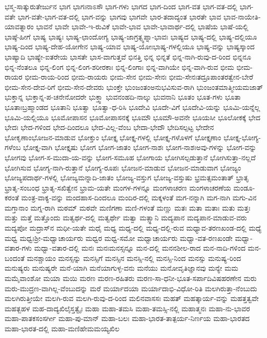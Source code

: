 {ಭಸ್ಮ-ಸಾತ್ಕುರುತೇರ್ಜುನ
ಭಾಗ
ಭಾಗಃನಾಽಸೌ
ಭಾಗ-ಗಳು
ಭಾಗದ
ಭಾಗ-ದಿಂದ
ಭಾಗ-ವತ
ಭಾಗ-ವತ-ದಲ್ಲಿ
ಭಾಗ-ವತೇ
ಭಾಗ-ವತೇ-ಭಾಗ-ವತ-ದಲ್ಲಿ
ಭಾಗ-ವನ್ನು
ಭಾಗವು
ಭಾಗವೇ
ಭಾರ-ತದಾದ್ಯಂತ
ಭಾರತೇ
ಭಾವ
ಭಾವ-ನಾಯೇತಿ-ಯಾವತ್ನಾರಂ
ಭಾವನೆ
ಭಾವೇ
ಭಾವೇ-ಇ-ರುವಿಕೆ
ಭಾವೇ-ಭಾವ
ಭಾವೇ-ಭಾವಾರ್ಥ-ದಲ್ಲಿ
ಭಾಷೆಯ
ಭಾಷೆ-ಯಲ್ಲಿ
ಭಾಷ್ಠೆ-ಹೀಗೆ
ಭಾಷ್ಯ
ಭಾಷ್ಯಃ
ಭಾಷ್ಯ-ಛಾಂದೋಗ್ಯ
ಭಾಷ್ಯ-ಜಾಗ್ರತ್ಸ್ವಪ್ನಾ-ಭಾವಃ
ಭಾಷ್ಯದ
ಭಾಷ್ಯ-ದಲ್ಲಿ
ಭಾಷ್ಯ-ದಲ್ಲಿಯೂ
ಭಾಷ್ಯ-ದಿಂದ
ಭಾಷ್ಯ-ದೇಹ-ಯೋಗೇನ
ಭಾಷ್ಯ-ಯಾವ
ಭಾಷ್ಯ-ಯೋಃಭಾಷ್ಯ-ಗಳಲ್ಲಿಯೂ
ಭಾಷ್ಯ-ವನ್ನು
ಭಾಷ್ಯಸ್ಕಾಂದ
ಭಾಷ್ಯಾದಿ
ಭಾಷ್ಯೇ-ಐತರೇಯ
ಭಾಸತೇ
ಭಾಸ-ವಾಗುತ್ತವೆ
ಭಿನತ್ತಿ
ಭಿನ್ನ
ಭಿನ್ನತೆ
ಭಿನ್ನ-ನಾಗಿ-ರುವು-ದ-ರಿಂದ
ಭಿನ್ನನೂ
ಭಿನ್ನ-ನೆಂತಲೂ
ಭಿನ್ನ-ಲಿಂಗ
ಭಿನ್ನ-ಲಿಂಗ-ಶರೀರಕಾಃ
ಭಿನ್ನ-ಲಿಂಗಾಃ
ಭಿನ್ನ-ವಾಗಿಯೇ
ಭಿನ್ನ-ವಾಗಿ-ರುವ
ಭೀಮ
ಭೀಮ-ರಾಯರ
ಭೀಮ-ರಾಯ-ರಿಂದ
ಭೀಮ-ರಾಯರು
ಭೀಮ-ಸೇನ
ಭೀಮ-ಸೇನಃ
ಭೀಮ-ಸೇನಃತದ್ರೂಪಾಂತರತ್ವೇನ-ಬೇರೆ
ಭೀಮ-ಸೇನ-ದೇವ-ರಿಗೆ
ಭೀಮ-ಸೇನ-ದೇವರು
ಭುಂಕ್ತೇ
ಭುಂಜಂತಂಅನುಭವಿಸುವ-ರಾಗಿ
ಭುಂಜಂತಮಾತ್ಮೀಯಮಜಾತ್
ಭುಕ್ತಾನ್ನ
ಭುಕ್ತಾನ್ನ-ಪ-ಚನೇನೋದರೇ
ಭುಕ್ತ್ವಾ
ಭುವನಂಹದಿ-ನಾಲ್ಕು
ಭುವನಾನಿ
ಭೂತಂ
ಭೂತ-ಗಳು
ಭೂತಾ
ಭೂತಾಃಬ್ರಹ್ಮಾಂಡದ
ಭೂತಾನಿ
ಭೂತ್ವಾ
ಭೂತ್ವಾ-ಧ-ರಿಸಿ
ಭೂದೇವಿ
ಭೂದೇ-ವಿಗೆ
ಭೂದೇವಿ-ಯನ್ನು
ಭೂಮಿ-ಯನ್ನೆಲ್ಲ
ಭೂಮಿ-ಯಲ್ಲಿಯೂ
ಭೂಮೋಪಾಸನ
ಭೂಮೋಪಾಸನಕ್ಕೆ
ಭೂಮೌ
ಭೂಮೌ-ಅವನೇ
ಭೂಯಸೀ
ಭೂಲೋಕಕ್ಕೆ
ಭೇದ
ಭೇದಃ
ಭೇದ-ಗಳಿಂದ
ಭೇದ-ದಿಂದಲೂ
ಭೇದ-ವಿಲ್ಲ-ವೆಂಬ
ಭೇದಾ-ಭೇದೌ
ಭೇದಿಸಲ್ಪಟ್ಟ
ಭೇದೇನ
ಭೋಕೃಣಾಂಭೋಜನ-ಮಾಡುವ
ಭೋಕ್ತುಂ
ಭೋಕ್ತೃ
ಭೋಕ್ತೃ-ಗಳಲ್ಲಿ
ಭೋಕ್ತೃ-ಗಳೊಳಗೆ
ಭೋಕ್ತೃಣಾಂ
ಭೋಕ್ತೃ-ಭೋಗ್ಯ-ಗಳೆಂಬ
ಭೋಕ್ತೃ-ವಾಗಿ
ಭೋಕ್ತೃಷು
ಭೋಗ
ಭೋಗ-ಜಾತಂ
ಭೋಗ-ನಾಶಃ
ಭೋಗ-ನಾಶಃಅವು-ಗಳನ್ನು
ಭೋಗ-ವನ್ನು
ಭೋಗವು
ಭೋಗ-ಸ-ಮುದಾ-ಯ-ವನ್ನು
ಭೋಗ-ಸಮೂಹ
ಭೋಗಾಯ
ಭೋಗಿಸಲ್ಪಡುತ್ತಾನೆ
ಭೋಗಿಸುತ್ತಾ-ನಲ್ಲದೆ
ಭೋಗಿಸುವ
ಭೋಗ್ಯ-ನಾಗಿ-ರುತ್ತಾನೆ
ಭೋಗ್ಯ-ರೂಪಃ
ಭೋಜನ-ಮಾಡುವ
ಭೋಜನ-ಮಾಡುವಾಗ
ಭೋಜ್ಯಂ
ಭೋಜ್ಯಪದಾರ್ಥ-ಗಳಲ್ಲಿ
ಭೋಜ್ಯಮನ್ನಾದಿ-ಜಾತಂ
ಭೋಜ್ಯ-ವಸ್ತುಗ
ಭೋಜ್ಯ-ವಸ್ತುಷು
ಭ್ರಮತ್ಸಮಂತಾತ್
ಭ್ರಾತೃ
ಭ್ರಾತೃ-ಸಂಬಂಧ
ಭ್ರಾತೃ-ಸಖಿತ್ವೇನ
ಭ್ರಾಮ-ಯತೇ
ಮಂಗಳ-ಗಳನ್ನೂ
ಮಂಗಳಾಚರಣ
ಮಂಗಳಾಚರಣೆಯ
ಮಂಡೂ-ಕರಂತೆ
ಮಂತ್ರ-ವಾಕ್ಯ-ವನ್ನು
ಮಂದಹಾಸ-ದಿಂದಲೂ
ಮಂದಿರ-ದಲ್ಲಿ
ಮಕ್ಕಳಂತೆ
ಮಗ-ನನ್ನಾಗಿ
ಮಗ-ನಾಗಿ
ಮಗು-ವಿನ
ಮಗ್ತಾನಾಂ
ಮಗ್ನ-ರಾಗಿ
ಮಠಮ್
ಮಠವೇ
ಮಣಿಗಣಾ
ಮಣಿ-ಗಳಂತೆ
ಮಣ್ಣು
ಮತಃ
ಮತಾ
ಮತಾಃ
ಮತು
ಮತ್ತಃ
ಮತ್ತು
ಮತ್ತೆ
ಮತ್ತೊಂದು
ಮತ್ವರ್ಥ-ದಲ್ಲಿ
ಮತ್ವರ್ಥೇ
ಮತ್ವಾ
ಮತ್ಸ್ಥಾನಿ
ಮದ್ಯಪಾನ
ಮದ್ಯಪಾನ-ಮಾಡುವ-ವರು
ಮದ್ಯಪೋ
ಮದ್ರಾಸ್‌ನ
ಮಧೀ-ಯತೇ
ಮಧೈ
ಮಧ್ಯ
ಮಧ್ಯ-ದಲ್ಲಿ
ಮಧ್ಯ-ದಲ್ಲಿ-ರುವ
ಮಧ್ಯಾವ-ತರಣಖಂಡ-ದಲ್ಲಿ
ಮಧ್ಯೆ
ಮಧ್ವ
ಮಧ್ವಃಶ್ರೀ-ಮಧ್ವಾಚಾರ್ಯರು
ಮಧ್ವರ
ಮಧ್ವ-ಸಮೋ
ಮಧ್ವಾಚಾರ್ಯರು
ಮಧ್ವಾ-ವತ-ರಣಖಂಡೇ
ಮಧ್ವಾ-ವತಾರ-ಗಳು
ಮಧ್ವಾ-ವತಾರ-ದಲ್ಲಿ
ಮನಃ
ಮನಃಮನಸ್ಸನ್ನೂ
ಮನ-ದಲ್ಲಿ
ಮನನಶೀಲ-ರಾದ
ಮನ-ನಾದಿ-ಗಳಿಂದ
ಮನ-ಬಂದಂತೆ
ಮನಶ್ಚಾಯಂ
ಮನಸ್ಸನ್ನು
ಮನಸ್ಸಿಗೆ
ಮನಸ್ಸಿನ
ಮನಸ್ಸಿ-ನಲ್ಲಿ
ಮನಸ್ಸಿ-ನಿಂದ
ಮನಸ್ಸು
ಮನುಷ್ಯ-ರಿಂದ
ಮನುಷ್ಯರು
ಮನುಷ್ಯರೇ
ಮನೆ-ಯಾಗಿ
ಮನೆಯಾಗುಳ್ಳ-ವನು
ಮನೆಯು
ಮನೋವೃತಿಜ್ಞಾನವು
ಮನ್ಯೇ
ಮಮ
ಮಮೈವಾಂಶೋ
ಮಯಾ
ಮಯಿ
ಮರಣ
ಮರಣ-ರಹಿತರು
ಮರಣ-ಸಾ-ಧನೀ-ಭೂತ-ಸರ್ಪಾದಿವಿಷಹರಣೇನ
ಮರು
ಮರು-ಮುದ್ರಣ-ವಾಗಿಲ್ಲ-ವೆಂಬುದನ್ನು
ಮರೆ
ಮರ್ಯಾದಯಾ
ಮರ್ಯಾದಾಭಿ-ವಿಧೋ-ರಿತಿ
ಮಲಗಿರುತ್ತಾ-ನೆಂಬುದು
ಮಲಗಿರುತ್ತೀಯೇ
ಮಲಗಿ-ರುವ
ಮಲಗಿ-ರುವು-ದ-ರಿಂದ
ಮಲಿನವಾಸಸಃ
ಮಹತ್
ಮಹತ್ಕಾರ್ಯ-ವನ್ನು
ಮಹತ್ತತ್ವವೇ
ಮಹತ್ಬಹಳ
ಮಹ-ದಾದ್ಯಖಿಲೈಸ್ತತ್ವೈಃ
ಮಹಾ
ಮಹಾ-ತಮಸಿ
ಮಹಾ-ತಮಸ್ಸಿ-ನಲ್ಲಿ
ಮಹಾತ್ಮನಃ
ಮಹಾ-ನು-ಭಾವರ
ಮಹಾ-ಪಾತಕಸಂಸರ್ಗೀ
ಮಹಾ-ಪು-ಮಾನ್
ಮಹಾ-ಬಲಃ
ಮಹಾ-ಭಾರತ-ತಾತ್ಪರ್ಯ-ನಿರ್ಣಯ
ಮಹಾ-ಭಾರತದ
ಮಹಾ-ಭಾರತ-ದಲ್ಲಿ
ಮಹಾ-ಮಣಿಹೇಮಮಯ್ಯಖಿಲ
}
